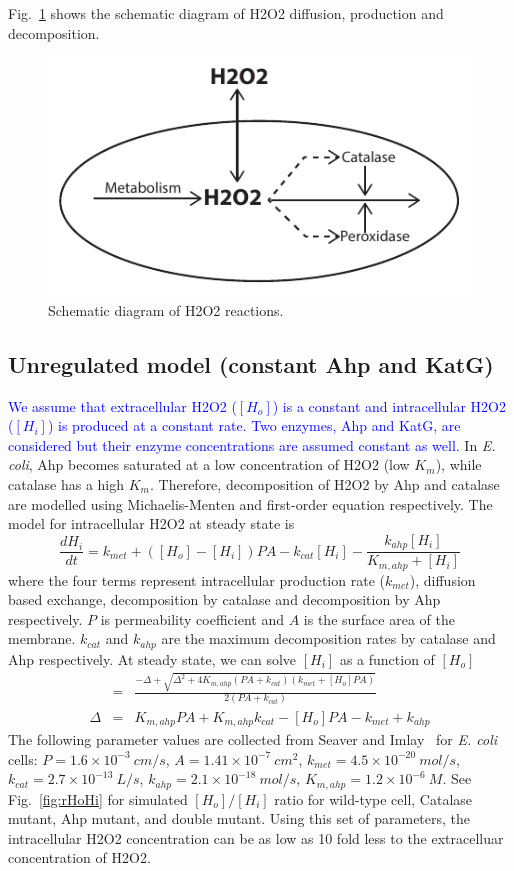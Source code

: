 \documentclass[11pt]{article}
\newcommand{\clblue}[1]{\textcolor{blue}{#1}}
\begin{document}
Fig.~\ref{fig:h2o2_decomposition_schematic_diagram} shows the schematic diagram of H2O2 diffusion, production and decomposition.

\begin{figure}[h!]
\centering
  \includegraphics[width=0.5\linewidth]{h2o2_decomposition.pdf}
  \caption{Schematic diagram of H2O2 reactions.}
  \label{fig:h2o2_decomposition_schematic_diagram}
\end{figure}

\subsection{Unregulated model (constant Ahp and KatG)}
\clblue{We assume that extracellular H2O2 ($[H_{o}]$) is a constant and intracellular H2O2 ($[H_{i}]$) is produced at a constant rate. Two enzymes, Ahp and KatG, are considered but their enzyme concentrations are assumed constant as well.} In \textit{E. coli}, Ahp becomes saturated at a low concentration of H2O2 (low $K_m$), while catalase has a high $K_m$. Therefore, decomposition of H2O2 by Ahp and catalase are modelled using Michaelis-Menten and first-order equation respectively. The model for intracellular H2O2 at steady state is
\begin{equation}
\frac{dH_i}{dt} = k_{met}+([H_o]-[H_i])PA - k_{cat}[H_i] - \frac{k_{ahp}[H_i]}{K_{m,ahp}+[H_i]}
\end{equation}
where the four terms represent intracellular production rate ($k_{met}$), diffusion based exchange, decomposition by catalase and decomposition by Ahp respectively. $P$ is permeability coefficient and $A$ is the surface area of the membrane. $k_{cat}$ and $k_{ahp}$ are the maximum decomposition rates by catalase and Ahp respectively. At steady state, we can solve $[H_i]$ as a function of $[H_o]$
\begin{eqnarray}
[H_i] &=& \frac{-\Delta +\sqrt{\Delta^2+4K_{m,ahp}(PA+k_{cat})(k_{met}+[H_o]PA)}}{2(PA+k_{cat})}  \label{eq:hi_ho}\\
\Delta &=& K_{m,ahp}PA+K_{m,ahp}k_{cat}-[H_o]PA-k_{met}+k_{ahp}
\end{eqnarray}
The following parameter values are collected from Seaver and Imlay~\cite{seaver2001hydrogen} for \textit{E. coli} cells: $P=1.6\times 10^{-3}~cm/s$, $A=1.41\times  10^{-7}~cm^2$, $k_{met}=4.5\times 10^{-20}~mol/s$, $k_{cat}=2.7\times 10^{-13}~L/s$, $k_{ahp}=2.1\times 10^{-18}~mol/s$, $K_{m,ahp} = 1.2\times 10^{-6}~M$. See Fig.~\ref{fig:rHoHi} for simulated $[H_o]/[H_i]$ ratio for wild-type cell, Catalase mutant, Ahp mutant, and double mutant. Using this set of parameters, the intracellular H2O2 concentration can be as low as 10 fold less to the extracelluar concentration of H2O2.
\end{document}
